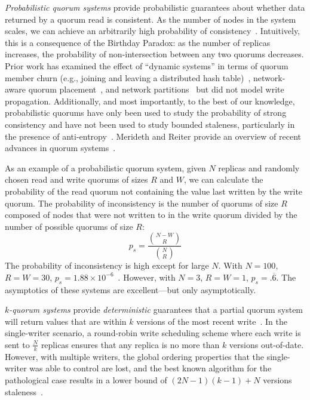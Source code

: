 \documentclass{vldb}
\begin{document}
\textit{Probabilistic quorum systems} provide probabilistic guarantees
about whether data returned by a quorum read is consistent.  As the
number of nodes in the system scales, we can achieve an arbitrarily
high probability of consistency~\cite{prob-quorum}.  Intuitively, this
is a consequence of the Birthday Paradox: as the number of replicas
increases, the probability of non-intersection between any two quorums
decreases.  Prior work has examined the effect of ``dynamic systems''
in terms of quorum member churn (e.g., joining and leaving a
distributed hash table)~\cite{prob-quorum-dynamic}, network-aware
quorum placement~\cite{delay-quorum, quorum-placement}, and network
partitions~\cite{partitionedquorum} but did not model write
propagation. Additionally, and most importantly, to the best of our
knowledge, probabilistic quorums have only been used to study the
probability of strong consistency and have not been used to study
bounded staleness, particularly in the presence of
anti-entropy~\cite{antientropy}.  Merideth and Reiter provide an
overview of recent advances in quorum systems~\cite{quorum-overview}.

As an example of a probabilistic quorum system, given $N$ replicas and
randomly chosen read and write quorums of sizes $R$ and $W$, we can
calculate the probability of the read quorum not containing the value
last written by the write quorum.  The probability of inconsistency is
the number of quorums of size $R$ composed of nodes that were not
written to in the write quorum divided by the number of possible
quorums of size $R$:
\begin{equation}
\label{eq:prob-strict}
p_{s}=\frac{{N-W \choose R}}{{N \choose R}}
\end{equation}
The probability of inconsistency is high except for large $N$.  With
$N=100$, $R=W=30$, $p_{s} = 1.88 \times
10^{-6}$~\cite{non-strict}.  However, with $N=3$, $R=W=1$, $p_{s}
= .\overline{6}$.  The asymptotics of these systems are
excellent---but only asymptotically.

\textit{$k$-quorum systems} provide \textit{deterministic} guarantees
that a partial quorum system will return values that are within $k$
versions of the most recent write~\cite{non-strict}.  In the
single-writer scenario, a round-robin write scheduling scheme where
each write is sent to $\frac{N}{k}$ replicas ensures that any replica
is no more than $k$ versions out-of-date.  However, with multiple
writers, the global ordering properties that the single-writer was
able to control are lost, and the best known algorithm for the
pathological case results in a lower bound of $(2N-1)(k-1)+N$ versions
staleness~\cite{multi-k-quorum}.
\end{document}
